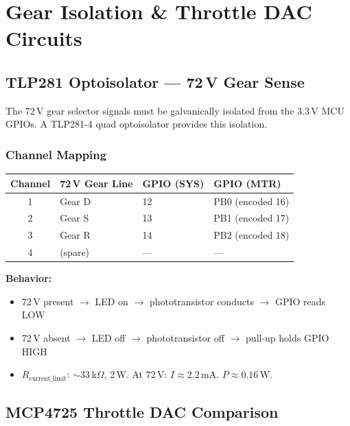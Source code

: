 \documentclass[12pt,a4paper,oneside]{report}
\begin{document}

\chapter{Gear Isolation \& Throttle DAC Circuits}

\section{TLP281 Optoisolator --- 72\,V Gear Sense}

The 72\,V gear selector signals must be galvanically isolated from the 3.3\,V MCU GPIOs. A TLP281-4 quad optoisolator provides this isolation.

\subsection{Channel Mapping}

\begin{center}
\begin{tabular}{clll}
\toprule
\textbf{Channel} & \textbf{72\,V Gear Line} & \textbf{GPIO (SYS)} & \textbf{GPIO (MTR)} \\
\midrule
1 & Gear D & 12 & PB0 (encoded 16) \\
2 & Gear S & 13 & PB1 (encoded 17) \\
3 & Gear R & 14 & PB2 (encoded 18) \\
4 & (spare) & --- & --- \\
\bottomrule
\end{tabular}
\end{center}

\noindent\textbf{Behavior:}
\begin{itemize}[leftmargin=*,nosep]
  \item 72\,V present $\rightarrow$ LED on $\rightarrow$ phototransistor conducts $\rightarrow$ GPIO reads LOW
  \item 72\,V absent $\rightarrow$ LED off $\rightarrow$ phototransistor off $\rightarrow$ pull-up holds GPIO HIGH
  \item $R_{\text{current\_limit}}$: $\sim$33\,k$\Omega$, 2\,W. At 72\,V: $I \approx 2.2$\,mA. $P \approx 0.16$\,W.
\end{itemize}

\section{MCP4725 Throttle DAC Comparison}
\end{document}
